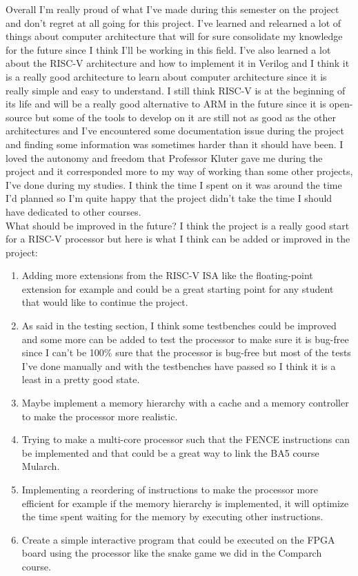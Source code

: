 Overall I'm really proud of what I've made during this semester on the project and don't regret at all going for this project.
I've learned and relearned a lot of things about computer architecture that will for sure consolidate my knowledge for the future
since I think I'll be working in this field. 
I've also learned a lot about the RISC-V architecture and how to implement it in Verilog and I think it is a really good architecture 
to learn about computer architecture since it is really simple and easy to understand.
I still think RISC-V is at the beginning of its life and will be a really good alternative to ARM in the future since it is open-source
but some of the tools to develop on it are still not as good as the other architectures and I've encountered some documentation issue 
during the project and finding some information was sometimes harder than it should have been.
I loved the autonomy and freedom that Professor Kluter gave me during the project and it corresponded more to my way of working
than some other projects, I've done during my studies. I think the time I spent on it was around the time I'd planned so I'm quite happy
that the project didn't take the time I should have dedicated to other courses.\\

What should be improved in the future?
I think the project is a really good start for a RISC-V processor but here is what I think can be added or improved in the project: 
\begin{enumerate}[label=\textbullet]
    \item Adding more extensions from the RISC-V ISA like the floating-point extension for example and could be a great starting
    point for any student that would like to continue the project.
    \item As said in the testing section, I think some testbenches could be improved and some more can be added to test the processor
    to make sure it is bug-free since I can't be 100\% sure that the processor is bug-free but most of the tests I've done manually
    and with the testbenches have passed so I think it is a least in a pretty good state.
    \item Maybe implement a memory hierarchy with a cache and a memory controller to make the processor more realistic.
    \item Trying to make a multi-core processor such that the FENCE instructions can be implemented and that could be a great
    way to link the BA5 course Mularch.
    \item Implementing a reordering of instructions to make the processor more efficient for example if the memory hierarchy is
    implemented, it will optimize the time spent waiting for the memory by executing other instructions.
    \item Create a simple interactive program that could be executed on the FPGA board using the processor like the snake game 
    we did in the Comparch course.
\end{enumerate}


